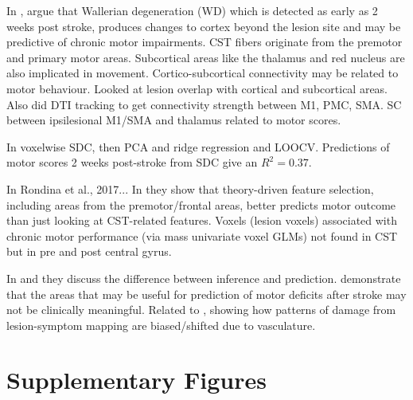 \documentclass[10pt]{article}
\begin{document}
In \cite{Peters2018-tf}, argue that Wallerian degeneration (WD) which is detected as early as 2 weeks post stroke, produces changes to cortex beyond the lesion site and may be predictive of chronic motor impairments. CST fibers originate from the premotor and primary motor areas. Subcortical areas like the thalamus and red nucleus are also implicated in movement. Cortico-subcortical connectivity may be related to motor behaviour. Looked at lesion overlap with cortical and subcortical areas. Also did DTI tracking to get connectivity strength between M1, PMC, SMA. SC between ipsilesional M1/SMA and thalamus related to motor scores.  

In \cite{Salvalaggio2020-pe} voxelwise SDC, then PCA and ridge regression and LOOCV. Predictions of motor scores 2 weeks post-stroke from SDC give an $R^2 = 0.37$.

In Rondina et al., 2017...
In \cite{Rondina2016-ds} they show that theory-driven feature selection, including areas from the premotor/frontal areas, better predicts motor outcome than just looking at CST-related features. Voxels (lesion voxels) associated with chronic motor performance (via mass univariate voxel GLMs) not found in CST but in pre and post central gyrus.

In \cite{Sperber2021-lw} and \cite{Bzdok2020-py} they discuss the difference between inference and prediction.  \cite{Sperber2021-lw} demonstrate that the areas that may be useful for prediction of motor deficits after stroke may not be clinically meaningful. Related to \cite{Mah2014-cb}, showing how patterns of damage from lesion-symptom mapping are biased/shifted due to vasculature.

\clearpage

\newcommand{\beginsupplement}{%
\setcounter{table}{0}
\renewcommand{\thetable}{S\arabic{table}}%
\setcounter{figure}{0}
\renewcommand{\thefigure}{S\arabic{figure}}%
}

\printbibliography

\beginsupplement
\section*{Supplementary Figures}
\end{document}
